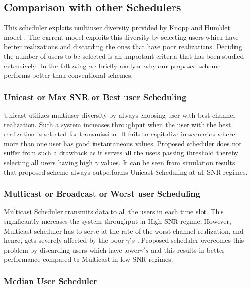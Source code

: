 \documentclass[conference]{IEEEtran}
\begin{document}
\subsection{Comparison with other Schedulers}


This scheduler exploits multiuser diversity provided by Knopp and Humblet model \cite{Knoop_and_Humblet}. The current model exploits this diversity by selecting users which have better realizations and discarding the ones that have poor realizations. Deciding the number of users to be selected is an important criteria that has been studied extensively. In the following we briefly analyze why our proposed scheme performs better than conventional schemes.

\subsubsection{Unicast or Max SNR or Best user Scheduling} 


Unicast utilizes multiuser diversity by always choosing user with best channel realization. Such a system increases throughput when the user  with the best realization is selected for transmission. It fails to capitalize in scenarios where more than one user has good instantaneous values. Proposed scheduler does not suffer from such a drawback as it serves all the users passing threshold thereby selecting all users having high $\gamma$  values. It can be seen from simulation results that proposed scheme always outperforms Unicast Scheduling at all SNR regimes.

\subsubsection{Multicast  or Broadcast or Worst user Scheduling}

Multicast Scheduler transmits data to all the users in each time slot. This significantly increases the system throughput in High SNR regime. However, Multicast scheduler has to serve at the rate of the worst channel realization, and hence, gets severely affected by the poor $\gamma 's$ . Proposed scheduler overcomes this problem by discarding users which have lower$\gamma 's$ and this results in better performance compared to Multicast in low SNR regimes.

\subsubsection{Median User Scheduler}
\end{document}
